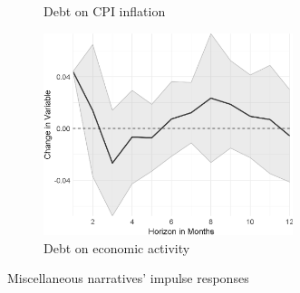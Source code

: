 \begin{figure}
\begin{subfigure}{00.24\textwidth}
		\caption{Debt on CPI inflation}
	\end{subfigure}
	\begin{subfigure}{00.24\textwidth}
		\includegraphics[width=0.8\textwidth]{output/lp/baseline/bHP/debt/debtoneconac_djn.eps}
		\caption{Debt on economic activity}
	\end{subfigure}
	\caption{Miscellaneous narratives' impulse responses}
	\label{fig:irf_3}
\end{figure}
